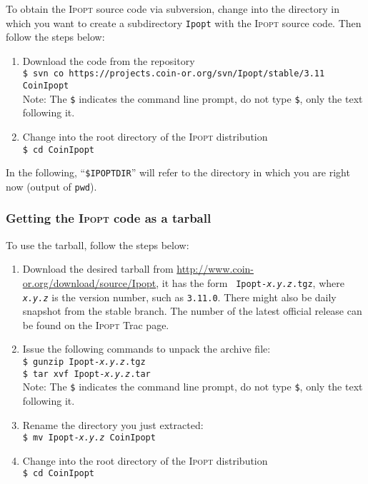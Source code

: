 \documentclass[10pt]{article}
\newcommand{\Ipopt}{\textsc{Ipopt}\xspace}
\begin{document}
To obtain the \Ipopt source code via subversion, change into the
directory in which you want to create a subdirectory {\tt Ipopt} with
the \Ipopt source code.  Then follow the steps below:
\begin{enumerate}
\item{Download the code from the repository}\\
{\tt \$ svn co https://projects.coin-or.org/svn/Ipopt/stable/3.11 CoinIpopt} \\
Note: The {\tt \$} indicates the command line
prompt, do not type {\tt \$}, only the text following it.
\item Change into the root directory of the \Ipopt distribution\\
{\tt \$ cd CoinIpopt}
\end{enumerate}

In the following, ``\texttt{\$IPOPTDIR}'' will refer to the directory in
which you are right now (output of \texttt{pwd}).

\subsubsection{Getting the \Ipopt code as a tarball}

To use the tarball, follow the steps below:
\begin{enumerate}
\item Download the desired tarball from
  \url{http://www.coin-or.org/download/source/Ipopt}, it has the form {\tt
    Ipopt-{\em x.y.z}.tgz}, where {\tt\em x.y.z} is the version
  number, such as {\tt 3.11.0}.  There might also be daily snapshot
  from the stable branch.  The number of the latest official release
  can be found on the \Ipopt Trac page.
\item Issue the following commands to unpack the archive file: \\
\texttt{\$ gunzip Ipopt-{\em x.y.z}.tgz} \\
\texttt{\$ tar xvf Ipopt-{\em x.y.z}.tar} \\
Note: The {\tt \$} indicates the command line
prompt, do not type {\tt \$}, only the text following it.
\item Rename the directory you just extracted:\\
\texttt{\$ mv Ipopt-{\em x.y.z} CoinIpopt}
\item Change into the root directory of the \Ipopt distribution\\
{\tt \$ cd CoinIpopt}
\end{enumerate}
\end{document}
